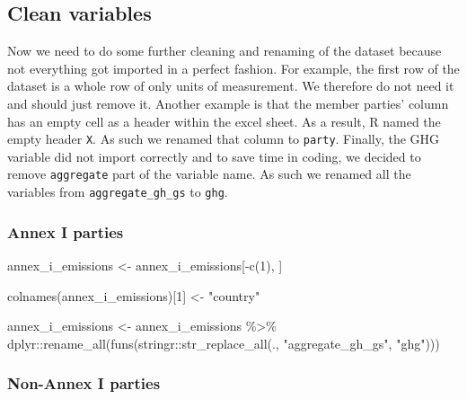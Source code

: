 \documentclass[
  12pt,
]{article}
\newenvironment{Shaded}{}{}
\newcommand{\DecValTok}[1]{\textcolor[rgb]{0.25,0.63,0.44}{#1}}
\newcommand{\FunctionTok}[1]{\textcolor[rgb]{0.02,0.16,0.49}{#1}}
\newcommand{\NormalTok}[1]{#1}
\newcommand{\OtherTok}[1]{\textcolor[rgb]{0.00,0.44,0.13}{#1}}
\newcommand{\SpecialCharTok}[1]{\textcolor[rgb]{0.25,0.44,0.63}{#1}}
\newcommand{\StringTok}[1]{\textcolor[rgb]{0.25,0.44,0.63}{#1}}
\begin{document}
\hypertarget{clean-variables}{%
\subsection{Clean variables}\label{clean-variables}}

Now we need to do some further cleaning and renaming of the dataset
because not everything got imported in a perfect fashion. For example,
the first row of the dataset is a whole row of only units of
measurement. We therefore do not need it and should just remove it.
Another example is that the member parties' column has an empty cell as
a header within the excel sheet. As a result, R named the empty header
\texttt{X}. As such we renamed that column to \texttt{party}. Finally,
the GHG variable did not import correctly and to save time in coding, we
decided to remove \texttt{aggregate} part of the variable name. As such
we renamed all the variables from \texttt{aggregate\_gh\_gs} to
\texttt{ghg}.

\hypertarget{annex-i-parties-1}{%
\subsubsection{Annex I parties}\label{annex-i-parties-1}}

\begin{Shaded}
\begin{Highlighting}[]
\NormalTok{annex\_i\_emissions }\OtherTok{\textless{}{-}}\NormalTok{ annex\_i\_emissions[}\SpecialCharTok{{-}}\FunctionTok{c}\NormalTok{(}\DecValTok{1}\NormalTok{), }
\NormalTok{    ]}

\FunctionTok{colnames}\NormalTok{(annex\_i\_emissions)[}\DecValTok{1}\NormalTok{] }\OtherTok{\textless{}{-}} \StringTok{"country"}

\NormalTok{annex\_i\_emissions }\OtherTok{\textless{}{-}}\NormalTok{ annex\_i\_emissions }\SpecialCharTok{\%\textgreater{}\%}
\NormalTok{    dplyr}\SpecialCharTok{::}\FunctionTok{rename\_all}\NormalTok{(}\FunctionTok{funs}\NormalTok{(stringr}\SpecialCharTok{::}\FunctionTok{str\_replace\_all}\NormalTok{(., }
        \StringTok{"aggregate\_gh\_gs"}\NormalTok{, }\StringTok{"ghg"}\NormalTok{)))}
\end{Highlighting}
\end{Shaded}

\hypertarget{non-annex-i-parties-1}{%
\subsubsection{Non-Annex I parties}\label{non-annex-i-parties-1}}
\end{document}
